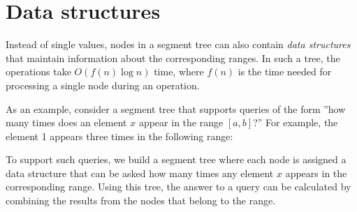 \section{Data structures}

Instead of single values, nodes in a segment tree
can also contain \emph{data structures} that maintain information
about the corresponding ranges.
In such a tree, the operations take
$O(f(n) \log n)$ time, where $f(n)$ is
the time needed for processing a single node during an operation.

As an example, consider a segment tree that
supports queries of the form
''how many times does an element $x$ appear
in the range $[a,b]$?''
For example, the element 1 appears three times
in the following range:

\begin{center}
\end{center}

To support such queries, we build a segment tree
where each node is assigned a data structure
that can be asked how many times any element $x$
appears in the corresponding range.
Using this tree,
the answer to a query can be calculated
by combining the results from the nodes
that belong to the range.

